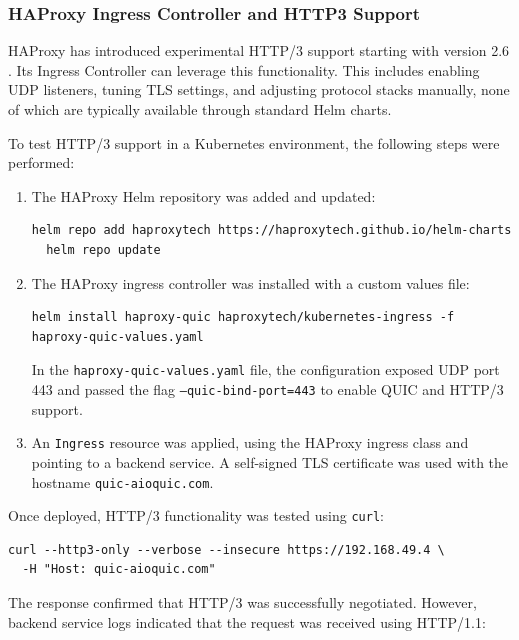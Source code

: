 \subsubsection{HAProxy Ingress Controller and HTTP3 Support}
HAProxy has introduced experimental HTTP/3 support starting with version 2.6 \cite{haproxy-docs} \cite{haproxy-k8s-docs}. Its Ingress Controller can leverage this functionality. This includes enabling UDP listeners, tuning TLS settings, and adjusting protocol stacks manually, none of which are typically available through standard Helm charts. 


To test HTTP/3 support in a Kubernetes environment, the following steps were performed:

\begin{enumerate}
  \item The HAProxy Helm repository was added and updated:
  \begin{lstlisting}[breaklines=true,basicstyle=\small\ttfamily,frame=single]
  helm repo add haproxytech https://haproxytech.github.io/helm-charts
  helm repo update
  \end{lstlisting}

  \item The HAProxy ingress controller was installed with a custom values file:
  \begin{lstlisting}[breaklines=true,basicstyle=\small\ttfamily,frame=single]
  helm install haproxy-quic haproxytech/kubernetes-ingress -f haproxy-quic-values.yaml
  \end{lstlisting}

  In the \texttt{haproxy-quic-values.yaml} file, the configuration exposed UDP port 443 and passed the flag \texttt{--quic-bind-port=443} to enable QUIC and HTTP/3 support.

  \item An \texttt{Ingress} resource was applied, using the HAProxy ingress class and pointing to a backend service. A self-signed TLS certificate was used with the hostname \texttt{quic-aioquic.com}.
\end{enumerate}

Once deployed, HTTP/3 functionality was tested using \texttt{curl}:

\begin{lstlisting}[breaklines=true,basicstyle=\small\ttfamily,frame=single]
curl --http3-only --verbose --insecure https://192.168.49.4 \
  -H "Host: quic-aioquic.com"
\end{lstlisting}

The response confirmed that HTTP/3 was successfully negotiated. However, backend service logs indicated that the request was received using HTTP/1.1:

